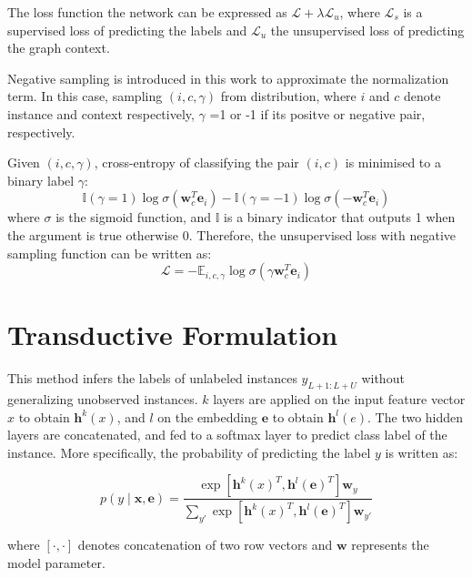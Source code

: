 \documentclass{article}
\begin{document}
The loss function the network can be expressed as $\mathcal{L} + \lambda
\mathcal{L}_u$, where $\mathcal{L}_s$ is a supervised loss of predicting the
labels and $\mathcal{L}_u$ the unsupervised loss of predicting the graph
context.

Negative sampling is introduced in this work to approximate the normalization
term. In this case, sampling $(i,c,\gamma)$ from distribution, where $i$ and
$c$ denote instance and context respectively, $\gamma$ =1 or -1 if its positve
or negative pair, respectively.

Given $(i,c,\gamma)$, cross-entropy of classifying the pair $(i,c)$ is minimised 
to a binary label $\gamma$:
\begin{equation}
  \mathbb{I}(\gamma = 1)\log
  \sigma(\mathbf{w}^T_c\mathbf{e}_i)-\mathbb{I}(\gamma = -1)\log
  \sigma(-\mathbf{w}^T_c\mathbf{e}_i)
  \label{eq:2}
\end{equation}
where $\sigma$ is the sigmoid function, and $\mathbb{I}$ is a binary indicator
that outputs 1 when the argument is true otherwise 0.
Therefore, the unsupervised loss with negative sampling function can be written as:
\begin{equation}
  \mathcal{L} = -\mathbb{E}_{i,c,\gamma}\log \sigma (\gamma \mathbf{w}^T_c \mathbf{e}_i)
  \label{eq:3}
\end{equation}

\section{Transductive Formulation}
This method infers the labels of unlabeled instances $y_{L+1:L+U}$ without
generalizing unobserved instances. $k$ layers are applied on the input feature
vector $x$ to obtain $\mathbf{h}^k(x)$, and $l$ on the embedding $\mathbf{e}$
to obtain $\mathbf{h}^l(e)$. The two hidden layers are concatenated, and fed to
a softmax layer to predict class label of the instance. More specifically, the
probability of predicting the label $y$ is written as:

\begin{equation}
  p(y \mid \mathbf{x}, \mathbf{e}) = \frac{\exp[\mathbf{h}^k(x)^T,
  \mathbf{h}^l(\mathbf{e})^T]\mathbf{w}_y} {\sum_{y'} \exp [\mathbf{h}^k(x)^T,
  \mathbf{h}^l(\mathbf{e})^T]\mathbf{w}_{y'}}
  \label{eq:4}
\end{equation}

where $[\cdot,\cdot]$ denotes concatenation of two row vectors and $\mathbf{w}$
represents the model parameter.
\end{document}
